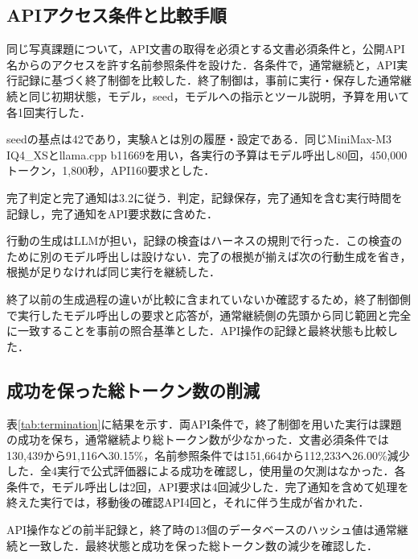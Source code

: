 \documentclass[letter]{ieicej}
\begin{document}
\subsection{APIアクセス条件と比較手順}

同じ写真課題について，API文書の取得を必須とする文書必須条件と，公開API名からのアクセスを許す名前参照条件を設けた．各条件で，通常継続と，API実行記録に基づく終了制御を比較した．終了制御は，事前に実行・保存した通常継続と同じ初期状態，モデル，seed，モデルへの指示とツール説明，予算を用いて各1回実行した．

seedの基点は42であり，実験Aとは別の履歴・設定である．同じMiniMax-M3 IQ4\_XSとllama.cpp b11669を用い，各実行の予算はモデル呼出し80回，450,000トークン，1,800秒，API160要求とした．

完了判定と完了通知は3.2に従う．判定，記録保存，完了通知を含む実行時間を記録し，完了通知をAPI要求数に含めた．

行動の生成はLLMが担い，記録の検査はハーネスの規則で行った．この検査のために別のモデル呼出しは設けない．完了の根拠が揃えば次の行動生成を省き，根拠が足りなければ同じ実行を継続した．

終了以前の生成過程の違いが比較に含まれていないか確認するため，終了制御側で実行したモデル呼出しの要求と応答が，通常継続側の先頭から同じ範囲と完全に一致することを事前の照合基準とした．API操作の記録と最終状態も比較した．

\subsection{成功を保った総トークン数の削減}

表\ref{tab:termination}に結果を示す．両API条件で，終了制御を用いた実行は課題の成功を保ち，通常継続より総トークン数が少なかった．文書必須条件では130,439から91,116へ30.15\%，名前参照条件では151,664から112,233へ26.00\%減少した．全4実行で公式評価器による成功を確認し，使用量の欠測はなかった．各条件で，モデル呼出しは2回，API要求は4回減少した．完了通知を含めて処理を終えた実行では，移動後の確認API4回と，それに伴う生成が省かれた．

\TerminationResultsTable

\par\noindent\begin{minipage}{\columnwidth}
API操作などの前半記録と，終了時の13個のデータベースのハッシュ値は通常継続と一致した．最終状態と成功を保った総トークン数の減少を確認した．
\end{minipage}\par{}
\end{document}

